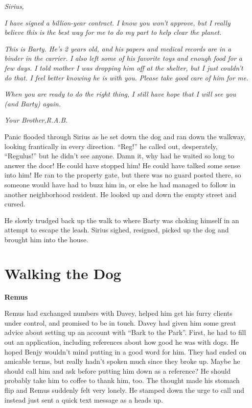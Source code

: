\documentclass[12pt,twoside,openright]{memoir}
\begin{document}
\textit{Sirius,} 

\textit{I have signed a billion-year contract. I know you won't approve, but I really believe this is the best way for me to do my part to help clear the planet. }

\textit{This is Barty. He's 2 years old, and his papers and medical records are in a binder in the carrier. I also left some of his favorite toys and enough food for a few days. I told mother I was dropping him off at the shelter, but I just couldn't do that. I feel better knowing he is with you. Please take good care of him for me. }

\textit{When you are ready to do the right thing, I still have hope that I will see you (and Barty) again.} 

\textit{Your Brother,\newline R.A.B.} 

Panic flooded through Sirius as he set down the dog and ran down the walkway, looking frantically in every direction.
``Reg!'' he called out, desperately, ``Regulus!'' but he didn't see anyone. Damn it, why had he waited so long to answer the door! He could have stopped him! He could have talked some sense into him! He ran to the property gate, but there was no guard posted there, so someone would have had to buzz him in, or else he had managed to follow in another neighborhood resident. He looked up and down the empty street and cursed. 

He slowly trudged back up the walk to where Barty was choking himself in an attempt to escape the leash. Sirius sighed, resigned, picked up the dog and brought him into the house.

\chapter{Walking the Dog}

\textbf{Remus} 

Remus had exchanged numbers with Davey, helped him get his furry clients under control, and promised to be in touch. Davey had given him some great advice about setting up an account with ``Bark to the Park''. First, he had to fill out an application, including references about how good he was with dogs. He hoped Benjy wouldn't mind putting in a good word for him. They had ended on amicable terms, but really hadn't spoken much since they broke up. Maybe he should call him and ask before putting him down as a reference? He should probably take him to coffee to thank him, too. The thought made his stomach flip and Remus suddenly felt very lonely. He stamped down the urge to call and instead just sent a quick text message as a heads up.
\end{document}
